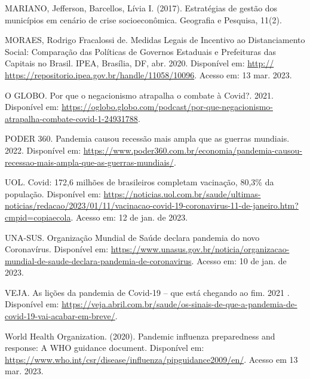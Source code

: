 \documentclass[
]{article}
\begin{document}
MARIANO, Jefferson, Barcellos, Lívia I. (2017). Estratégias de gestão
dos municípios em cenário de crise socioeconômica. Geografia e Pesquisa,
11(2).

MORAES, Rodrigo Fracalossi de. Medidas Legais de Incentivo ao
Distanciamento Social: Comparação das Políticas de Governos Estaduais e
Prefeituras das Capitais no Brasil. IPEA, Brasília, DF, abr. 2020.
Disponível em: \url{http://}
\url{https://repositorio.ipea.gov.br/handle/11058/10096}. Acesso em: 13
mar. 2023.

O GLOBO. Por que o negacionismo atrapalha o combate à Covid?. 2021.
Disponível em:
\url{https://oglobo.globo.com/podcast/por-que-negacionismo-atrapalha-combate-covid-1-24931788}.

PODER 360. Pandemia causou recessão mais ampla que as guerras mundiais.
2022. Disponível em:
\url{https://www.poder360.com.br/economia/pandemia-causou-recessao-mais-ampla-que-as-guerras-mundiais/}.

UOL. Covid: 172,6 milhões de brasileiros completam vacinação, 80,3\% da
população. Disponível em:
\url{https://noticias.uol.com.br/saude/ultimas-noticias/redacao/2023/01/11/vacinacao-covid-19-coronavirus-11-de-janeiro.htm?cmpid=copiaecola}.
Acesso em: 12 de jan. de 2023.

UNA-SUS. Organização Mundial de Saúde declara pandemia do novo
Coronavírus. Disponível em:
\url{https://www.unasus.gov.br/noticia/organizacao-mundial-de-saude-declara-pandemia-de-coronavirus}.
Acesso em: 10 de jan. de 2023.

VEJA. As lições da pandemia de Covid-19 -- que está chegando ao fim.
2021 . Disponível em:
\url{https://veja.abril.com.br/saude/os-sinais-de-que-a-pandemia-de-covid-19-vai-acabar-em-breve/}.

World Health Organization. (2020). Pandemic influenza preparedness and
response: A WHO guidance document. Disponível em:
\url{https://www.who.int/csr/disease/influenza/pipguidance2009/en/}.
Acesso em 13 mar. 2023.
\end{document}
